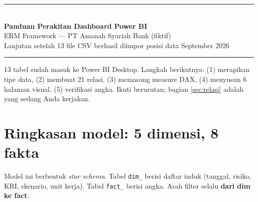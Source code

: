 \documentclass[11pt,a4paper]{article}
\newcommand{\file}[1]{\texttt{\small #1}}
\begin{document}
\sloppy

\begin{center}
{\color{navy}\rule{\linewidth}{1.6pt}}\\[0.8em]
{\LARGE\bfseries\color{navy} Panduan Perakitan Dashboard Power BI}\\[0.4em]
{\large ERM Framework --- PT Amanah Syariah Bank (fiktif)}\\[0.4em]
{\small Lanjutan setelah 13 file CSV berhasil diimpor \textbullet{} posisi data September 2026}\\[0.6em]
{\color{navy}\rule{\linewidth}{0.8pt}}
\end{center}

\begin{infobox}
13 tabel sudah masuk ke Power BI Desktop. Langkah berikutnya: (1) merapikan tipe data, (2) membuat 21 relasi, (3) memasang measure DAX, (4) menyusun 6 halaman visual, (5) verifikasi angka. Ikuti berurutan; bagian \ref{sec:relasi} adalah yang sedang Anda kerjakan.
\end{infobox}

\tableofcontents
\newpage

\section{Ringkasan model: 5 dimensi, 8 fakta}

Model ini berbentuk \emph{star schema}. Tabel \file{dim\_} berisi daftar induk (tanggal, risiko, KRI, skenario, unit kerja). Tabel \file{fact\_} berisi angka. Arah filter selalu \textbf{dari dim ke fact}.
\end{document}
